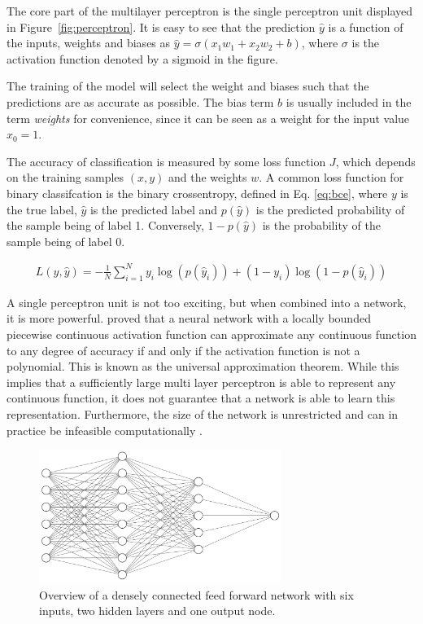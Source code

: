 The core part of the multilayer perceptron is the single perceptron unit displayed in Figure~\ref{fig:perceptron}. It is easy to see that the prediction $\hat{y}$ is a function of the inputs, weights and biases as $\hat{y} = \sigma(x_1 w_1 + x_2 w_2 + b)$, where $\sigma$ is the activation function denoted by a sigmoid in the figure. 

The training of the model will select the weight and biases such that the predictions are as accurate as possible. The bias term $b$ is usually included in the term \textit{weights} for convenience, since it can be seen as a weight for the input value $x_0 = 1$. 

The accuracy of classification is measured by some loss function $J$, which depends on the training samples $(x,y)$ and the weights $w$.  A common loss function for binary classifcation is the binary crossentropy, defined in Eq. \ref{eq:bce}, where $y$ is the true label, $\hat{y}$ is the predicted label and $p(\hat{y})$ is the predicted probability of the sample being of label 1. Conversely, $1 - p(\hat{y})$ is the probability of the sample being of label 0. 

\begin{align}
    L(y,\hat{y}) = -\frac{1}{N} \sum_{i=1}^N y_i \log{(p(\hat{y}_i))} + (1 - y_i) \log{(1 - p(\hat{y}_i))} \label{eq:bce}
\end{align}

A single perceptron unit is not too exciting, but when combined into a network, it is more powerful. \citet{leshno1993multilayer} proved that a neural network with a locally bounded piecewise continuous activation function can approximate any continuous function to any degree of accuracy if and only if the activation function is not a polynomial. This is known as the universal approximation theorem. While this implies that a sufficiently large multi layer perceptron is able to represent any continuous function, it does not guarantee that a network is able to learn this representation. Furthermore, the size of the network is unrestricted and can in practice be infeasible computationally \citep{Goodfellow-et-al-2016}. 


\begin{figure}[th]
    \centering
    \includegraphics[width=0.7\textwidth]{Figures/ff.PNG}
    \caption{Overview of a densely connected feed forward network with six inputs, two hidden layers and one output node.}
    \label{fig:mlp}
\end{figure}

